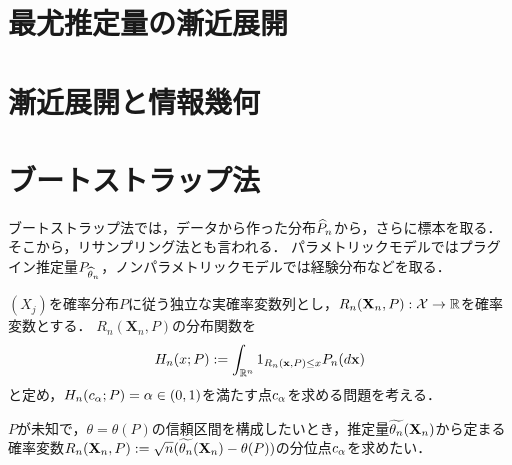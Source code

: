 \documentclass[uplatex,dvipdfmx]{jsreport}
\begin{document}
\section{最尤推定量の漸近展開}

\section{漸近展開と情報幾何}

\begin{tcolorbox}[colframe=ForestGreen, colback=ForestGreen!10!white,breakable,colbacktitle=ForestGreen!40!white,coltitle=black,fonttitle=\bfseries\sffamily,
title=]
    
\end{tcolorbox}

\section{ブートストラップ法}

\begin{tcolorbox}[colframe=ForestGreen, colback=ForestGreen!10!white,breakable,colbacktitle=ForestGreen!40!white,coltitle=black,fonttitle=\bfseries\sffamily,
title=]
    ブートストラップ法では，データから作った分布$\widehat{P}_n$から，さらに標本を取る．そこから，リサンプリング法とも言われる．
    パラメトリックモデルではプラグイン推定量$P_{\widehat{\theta}_n}$，ノンパラメトリックモデルでは経験分布などを取る．
\end{tcolorbox}

\begin{notation}
    $(X_j)$を確率分布$P$に従う独立な実確率変数列とし，$R_n(\mathbf{X}_n,P):\mathcal{X}\to\mathbb{R}$を確率変数とする．
    $R_n(\mathbf{X}_n,P)$の分布関数を
    \[H_n(x;P):=\int_{\mathbb{R}^n}1_{R_n(\mathbf{x},P)\le x}P_n(d\mathbf{x})\]
    と定め，$H_n(c_\alpha;P)=\alpha\in(0,1)$を満たす点$c_\alpha$を求める問題を考える．
\end{notation}
\begin{example}
    $P$が未知で，$\theta=\theta(P)$の信頼区間を構成したいとき，推定量$\widetilde{\theta_n}(\mathbf{X}_n)$から定まる確率変数$R_n(\mathbf{X}_n,P):=\sqrt{n}(\widetilde{\theta_n}(\mathbf{X}_n)-\theta(P))$の分位点$c_\alpha$を求めたい．
\end{example}
\end{document}
